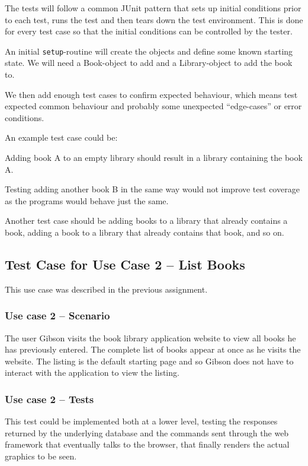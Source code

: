 The tests will follow a common JUnit pattern that sets up initial conditions
prior to each test, runs the test and then tears down the test environment.
This is done for every test case so that the initial conditions can be
controlled by the tester.

An initial \texttt{setup}-routine will create the objects and define some
known starting state. We will need a Book-object to add and a Library-object
to add the book to.

We then add enough test cases to confirm expected behaviour, which means test
expected common behaviour and probably some unexpected ``edge-cases'' or error
conditions. 

An example test case could be:

Adding book A to an empty library should result in a library containing the book A.

Testing adding another book B in the same way would not improve test coverage
as the programs would behave just the same.

Another test case should be adding books to a library that already contains a
book, adding a book to a library that already contains that book, and so on.


\subsection{Test Case for Use Case 2 -- List Books}\label{task-2b}
This use case was described in the previous assignment.

\subsubsection{Use case 2 -- Scenario}
The user Gibson visits the book library application website to view all books
he has previously entered. The complete list of books appear at once as he
visits the website. The listing is the default starting page and so Gibson does
not have to interact with the application to view the listing.


\subsubsection{Use case 2 -- Tests}
This test could be implemented both at a lower level, testing the responses
returned by the underlying database and the commands sent through the 
web framework that eventually talks to the browser, that finally renders the
actual graphics to be seen.

